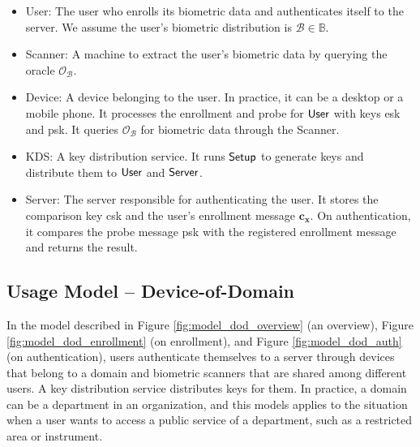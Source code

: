 \begin{itemize}

	\item {\sf User}: The user who enrolls its biometric data and authenticates itself to the server. We assume the user's biometric distribution is $\mathcal{B} \in \mathbb{B}$. 

	\item {\sf Scanner}: A machine to extract the user's biometric data by querying the oracle $\mathcal{O}_{\mathcal{B}}$.
	
	\item {\sf Device}: A device belonging to the user. In practice, it can be a desktop or a mobile phone. It processes the enrollment and probe for ${\sf User}$ with keys {\sf esk} and {\sf psk}. It queries $\mathcal{O}_{\mathcal{B}}$ for biometric data through the {\sf Scanner}.
	
	\item {\sf KDS}: A key distribution service. It runs ${\sf Setup}$ to generate keys and distribute them to ${\sf User}$ and ${\sf Server}$.
		
	\item {\sf Server}: The server responsible for authenticating the user. It stores the comparison key {\sf csk} and the user's enrollment message $\mathbf{c_x}$. On authentication, it compares the probe message {\sf psk} with the registered enrollment message and returns the result.  

\end{itemize}





\subsection{Usage Model – Device-of-Domain}
\label{sec:dod_model}

In the model described in Figure \ref{fig:model_dod_overview} (an overview), Figure \ref{fig:model_dod_enrollment} (on enrollment), and Figure \ref{fig:model_dod_auth} (on authentication), users authenticate themselves to a server through devices that belong to a domain and biometric scanners that are shared among different users. A key distribution service distributes keys for them. In practice, a domain can be a department in an organization, and this models applies to the situation when a user wants to access a public service of a department, such as a restricted area or instrument. 

